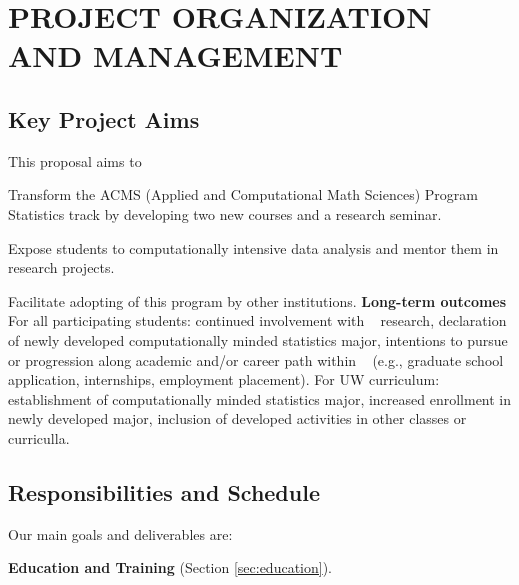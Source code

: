 \section{PROJECT ORGANIZATION AND MANAGEMENT}
\label{plan}

\subsection{                      Key Project Aims                   }
\label{sec:key-aims}
 
This proposal aims to 
\bits
\item Transform the ACMS (Applied and Computational Math Sciences) Program Statistics track
by developing two new courses and a research seminar. 
\item Expose students to computationally intensive data analysis and mentor them in research projects. 
\item Facilitate adopting of this program by other institutions.
\eits  
{\bf Long-term outcomes} For all participating students: 
continued involvement with \cdse~ research, 
declaration of newly developed computationally minded statistics major,
intentions to pursue or progression along academic and/or career path within \cdse~ (e.g., graduate school application, internships, employment placement). 
For UW curriculum: establishment of computationally minded statistics major,
increased enrollment in newly developed major, inclusion of developed activities in other classes or curriculla.


\subsection{Responsibilities and Schedule}

\vskip 0.1in Our main goals and deliverables are: 
\bits
\item {\bf Education and Training} (Section \ref{sec:education}).

